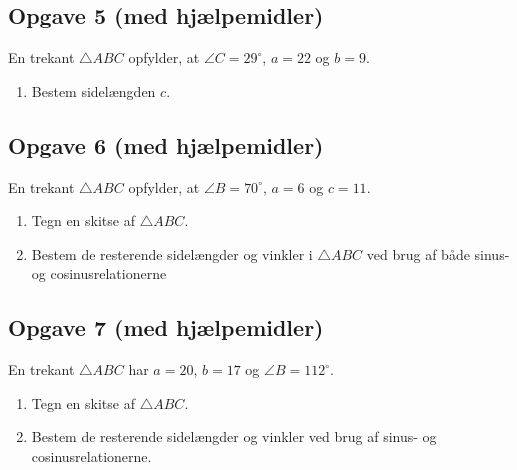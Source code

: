 \begin{center}
\begin{minipage}{0.45\textwidth}
	\end{minipage}
\end{center}

\subsection*{Opgave 5 (med hjælpemidler)}
En trekant $\triangle ABC$ opfylder, at $\angle C = 29^\circ$, $a = 22$ og $b = 9$.
\begin{enumerate}[label=\roman*)]
	\item Bestem sidelængden $c$.
\end{enumerate}

\subsection*{Opgave 6 (med hjælpemidler)}
En trekant $\triangle ABC$ opfylder, at $\angle B = 70^\circ$, $a = 6$ og $c = 11$.
\begin{enumerate}[label=\roman*)	]
	\item Tegn en skitse af $\triangle ABC$. 
	\item Bestem de resterende sidelængder og vinkler i $\triangle ABC$ ved brug af både sinus- og 
	cosinusrelationerne
\end{enumerate}

\subsection*{Opgave 7 (med hjælpemidler)}
En trekant $\triangle ABC$ har $a = 20$, $b = 17$ og $\angle B = 112^\circ$.
\begin{enumerate}[label=\roman*)]
	\item Tegn en skitse af $\triangle ABC$.
	\item Bestem de resterende sidelængder og vinkler ved brug af sinus- og cosinusrelationerne. 
\end{enumerate}


